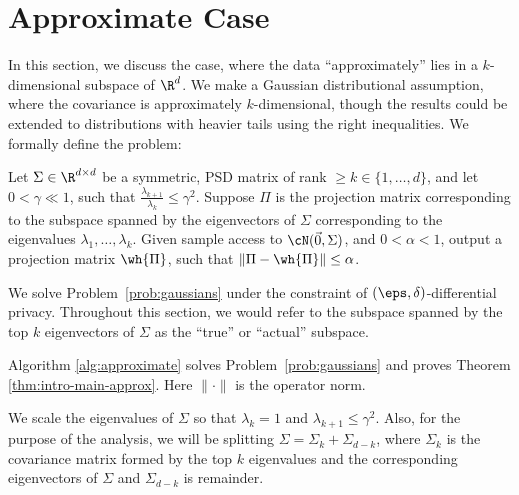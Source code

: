 \section{Approximate Case}

In this section, we discuss the case, where the data
``approximately'' lies in a $k$-dimensional subspace of
$\R^d$. %
We make a Gaussian distributional assumption, where the
covariance is approximately $k$-dimensional, though the
results could be extended to distributions with heavier
tails using the right inequalities. We formally define
the problem:

\begin{problem}\label{prob:gaussians}
    Let $\Sigma \in \R^{d \times d}$ be a symmetric, PSD
    matrix of rank $\geq k \in \{1,\dots,d\}$, and let $0 < \gamma \ll 1$,
    such that $\tfrac{\lambda_{k+1}}{\lambda_k} \leq \gamma^2$.
    Suppose $\Pi$ is the projection matrix corresponding
    to the subspace spanned by the eigenvectors of $\Sigma$
    corresponding to the eigenvalues $\lambda_1,\dots,\lambda_k$.
    Given sample access to $\cN(\vec{0},\Sigma)$,
    and $0 < \alpha < 1$, output a projection matrix $\wh{\Pi}$,
    such that $\|\Pi-\wh{\Pi}\| \leq \alpha$.
\end{problem}

We solve Problem~\ref{prob:gaussians} under the constraint
of $(\eps,\delta)$-differential privacy. Throughout this section,
we would refer to the subspace spanned by the top $k$ eigenvectors
of $\Sigma$ as the ``true'' or ``actual'' subspace.

Algorithm \ref{alg:approximate} solves Problem~\ref{prob:gaussians} and proves Theorem \ref{thm:intro-main-approx}.
Here $\|\cdot\|$ is the operator norm.

\begin{remark}\label{rem:gamma}
    We scale the eigenvalues of $\Sigma$
    so that $\lambda_k=1$ and $\lambda_{k+1} \leq \gamma^2$.
    Also, for the purpose of the analysis, we will be splitting
    $\Sigma = \Sigma_k + \Sigma_{d-k}$, where $\Sigma_k$ is the
    covariance matrix formed by the top $k$ eigenvalues and
    the corresponding eigenvectors of $\Sigma$ and $\Sigma_{d-k}$
    is remainder.
\end{remark}


